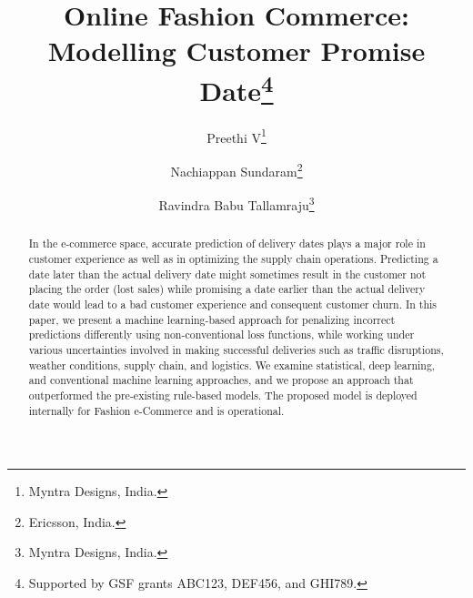 \documentclass[twoside,leqno,twocolumn]{article}
\begin{document}

\title{\Large Online Fashion Commerce: Modelling Customer Promise Date\thanks{Supported by GSF grants ABC123, DEF456, and GHI789.}}
\author{Preethi V\thanks{Myntra Designs, India.}
\and Nachiappan Sundaram\thanks{Ericsson, India.}
\and Ravindra Babu Tallamraju\thanks{Myntra Designs, India.}}

\date{}

\maketitle







\begin{abstract} \small\baselineskip=9pt In the e-commerce space, accurate prediction of delivery dates plays a major role in customer experience as well as in optimizing the supply chain operations. Predicting a date later than the actual delivery date might sometimes result in the customer not placing the order (lost sales) while promising a date earlier than the actual delivery date would lead to a bad customer experience and consequent customer churn. In this paper, we present a machine learning-based approach for penalizing incorrect predictions differently using non-conventional loss functions, while working under various uncertainties involved in making successful deliveries such as traffic disruptions, weather conditions, supply chain, and logistics. We examine statistical, deep learning, and conventional machine learning approaches, and we propose an approach that outperformed the pre-existing rule-based models. The proposed model is deployed internally for Fashion e-Commerce and is operational.\end{abstract}
\end{document}
